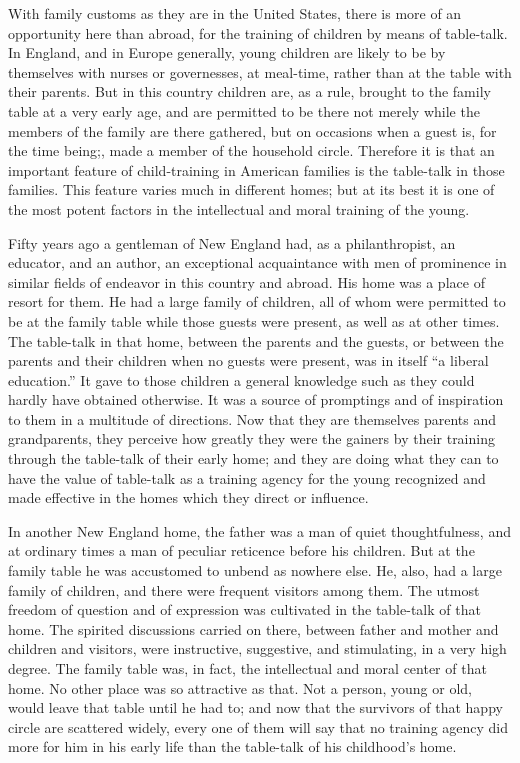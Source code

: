 \documentclass[
]{book}
\begin{document}
With family customs as they are in the United States, there is more of an opportunity here than abroad, for the training of children by means of table-talk. In England, and in Europe generally, young children are likely to be by themselves with nurses or governesses, at meal-time, rather than at the table with their parents. But in this country children are, as a rule, brought to the family table at a very early age, and are permitted to be there not merely while the members of the family are there gathered, but on occasions when a guest is, for the time being;, made a member of the household circle. Therefore it is that an important feature of child-training in American families is the table-talk in those families. This feature varies much in different homes; but at its best it is one of the most potent factors in the intellectual and moral training of the young.

Fifty years ago a gentleman of New England had, as a philanthropist, an educator, and an author, an exceptional acquaintance with men of prominence in similar fields of endeavor in this country and abroad. His home was a place of resort for them. He had a large family of children, all of whom were permitted to be at the family table while those guests were present, as well as at other times. The table-talk in that home, between the parents and the guests, or between the parents and their children when no guests were present, was in itself ``a liberal education.'' It gave to those children a general knowledge such as they could hardly have obtained otherwise. It was a source of promptings and of inspiration to them in a multitude of directions. Now that they are themselves parents and grandparents, they perceive how greatly they were the gainers by their training through the table-talk of their early home; and they are doing what they can to have the value of table-talk as a training agency for the young recognized and made effective in the homes which they direct or influence.

In another New England home, the father was a man of quiet thoughtfulness, and at ordinary times a man of peculiar reticence before his children. But at the family table he was accustomed to unbend as nowhere else. He, also, had a large family of children, and there were frequent visitors among them. The utmost freedom of question and of expression was cultivated in the table-talk of that home. The spirited discussions carried on there, between father and mother and children and visitors, were instructive, suggestive, and stimulating, in a very high degree. The family table was, in fact, the intellectual and moral center of that home. No other place was so attractive as that. Not a person, young or old, would leave that table until he had to; and now that the survivors of that happy circle are scattered widely, every one of them will say that no training agency did more for him in his early life than the table-talk of his childhood's home.
\end{document}

